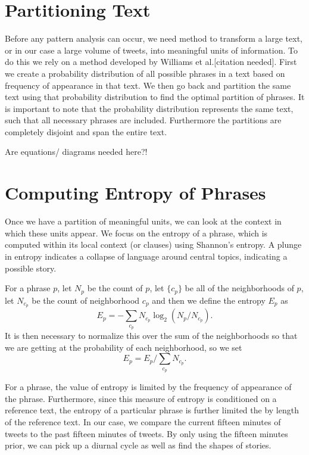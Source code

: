 \section{Partitioning Text}

Before any pattern analysis can occur, we need method to transform a
large text, or in our case a large volume of tweets, into meaningful
units of information. To do this we rely on a method developed by
Williams et al.[citation needed]. First we create a probability
distribution of all possible phrases in a text based on frequency of
appearance in that text. We then go back and partition the same text
using that probability distribution to find the optimal partition of
phrases. It is important to note that the probability distribution
represents the same text, such that all necessary phrases are
included. Furthermore the partitions are completely disjoint and span
the entire text.

Are equations/ diagrams needed here?!  

\section{Computing Entropy of Phrases}

Once we have a partition of meaningful units, we can look at the
context in which these units appear. We focus on the entropy of a
phrase, which is computed within its local context (or clauses) using
Shannon's entropy. A plunge in entropy indicates a collapse of
language around central topics, indicating a possible story. 

For a phrase $p$, let $N_p$ be the count of $p$, let $\{ c_p \}$ be
all of the neighborhoods of $p$, let $N_{c_p}$ be the count of
neighborhood $c_p$ and then we define the entropy $E_p$ as
\[ E_p = -\sum _{c_p} N_{c_p} \log _2 \left ( N_p / N_{c_p} \right )
.\] It is then necessary to normalize this over the sum of the
neighborhoods so that we are getting at the probability of each
neighborhood, so we set
\[ E_p = E_p / \sum _{c_p} N_{c_p} .\]

For a phrase, the value of entropy is limited by the frequency of
appearance of the phrase.
Furthermore, since this measure of entropy is conditioned on a
reference text, the entropy of a particular phrase is further limited
the by length of the reference text. In our case, we compare the
current fifteen minutes of tweets to the past fifteen minutes of
tweets. By only using the fifteen minutes prior, we can pick up a
diurnal cycle as well as find the shapes of stories.

